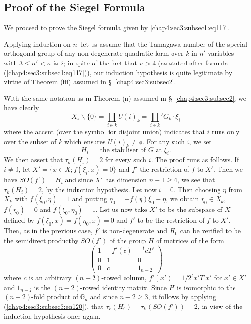 \subsection{Proof of the Siegel Formula}\label{chap4:sec3:subsec4} %

We proceed to prove the Siegel formula given by
\ref{chap4:sec3:subsec1:eq117}. 

Applying induction on $n$, let us assume that the Tamagawa number of
the special orthogonal group of any non-degenerate quadratic form over
$k$ in $n'$ variables with $3\leq n'<n$ is $2$; in spite of the fact
that $n>4$ (as stated after formula (\ref{chap4:sec3:subsec1:eq117})), our induction
hypothesis is quite legitimate by virtue of Theorem (iii) assumed in
\S\ \ref{chap4:sec3:subsec2}.

With the same notation as in Theorem (ii) assumed in
\S\ \ref{chap4:sec3:subsec2}, we
have clearly
\begin{equation*}
  X_{k}\backslash \{0\}=\coprod\limits_{i\in
    k}U(i)_{k}=\coprod\limits_{i\in k}{}'G_{k}\cdot
  \xi_{i}\tag{121} \label{chap4:sec3:subsec3:eq121} 
\end{equation*}
where the accent (over the symbol for disjoint union) indicates that
$i$ runs only over the subset of $k$ which ensures $U(i)_{k}\neq
\phi$. For any such $i$, we set
$$
H_{i}= \text{ the stabiliser of $G$ at } \xi_{i}.
$$
We then assert that $\tau_{k}(H_{i})=2$ for every such $i$. The proof
runs as follows. If $i\neq 0$, let $X'=\{x\in X;f(\xi_{i},x)=0\}$ and
$f'$ the restriction of $f$ to $X'$. Then we have $SO(f')=H_{i}$ and
since $X'$ has dimension $n-1\geq 4$, we see that $\tau_{k}(H_{i})=2$,
by the induction hypothesis. Let now $i=0$. Then choosing $\eta$ from
$X_{k}$ with $f(\xi_{0},\eta)=1$ and putting
$\eta_{0}=-f(\eta)\xi_{0}+\eta$, we obtain $\eta_{0}\in X_{k}$,
$f(\eta_{0})=0$ and $f(\xi_{0},\eta_{0})=1$. Let us now take $X'$ to
be the subspace of $X$ defined by $f(\xi_{0},x)=f(\eta_{0},x)=0$ and
$f'$ to be the restriction of $f$ to $X'$. Then, as in the previous
case, $f'$ is non-degenerate and $H_{0}$ can be verified to be the
semidirect product\pageoriginale by $SO(f')$ of the group $H$ of
matrices of the form
$$ 
\begin{pmatrix} 
  1 & -f'(c) & -{}^{t}cT'\\
  0 & 1 & 0\\
  0 & c & 1_{n-2}
\end{pmatrix}
$$
where $c$ is an arbitrary $(n-2)$-rowed column, $f'(x')=1/2^{t}x'T'x'$
for $x'\in X'$ and $1_{n-2}$ is the $(n-2)$-rowed identity
matrix. Since $H$ is isomorphic to the $(n-2)$-fold product of
$\mathbb{G}_{a}$ and since $n-2\geq 3$, it follows by applying
(\ref{chap4:sec3:subsec3:eq120}), that
$\tau_{k}(H_{0})=\tau_{k}(SO(f'))=2$, in view of the 
induction hypothesis once again.

